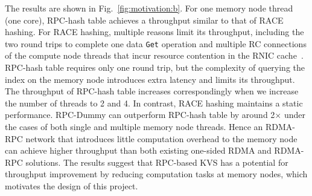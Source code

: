 The results are shown in Fig.~\ref{fig:motivation:b}. For one memory node thread (one core), RPC-hash table achieves a throughput similar to that of RACE hashing.
For RACE hashing, multiple reasons limit its throughput, including the two round trips to complete one data \texttt{Get} operation and multiple RC connections of the compute node threads that incur resource contention in the RNIC cache~\cite{scalablerpc}.
RPC-hash table requires only one round trip, but the complexity of querying the index on the memory node introduces extra latency and limits its throughput.  
The throughput of RPC-hash table increases correspondingly when we increase the number of threads to 2 and 4. In contrast, RACE hashing maintains a static performance.
RPC-Dummy can outperform RPC-hash table by around 2$\times$ under the cases of both single and multiple memory node threads. 
Hence an RDMA-RPC network that introduces little computation overhead to the memory node can achieve higher throughput than both existing one-sided RDMA and RDMA-RPC solutions. 
The results suggest that RPC-based KVS has a potential for throughput improvement by reducing computation tasks at memory nodes, which motivates the design of this project.



